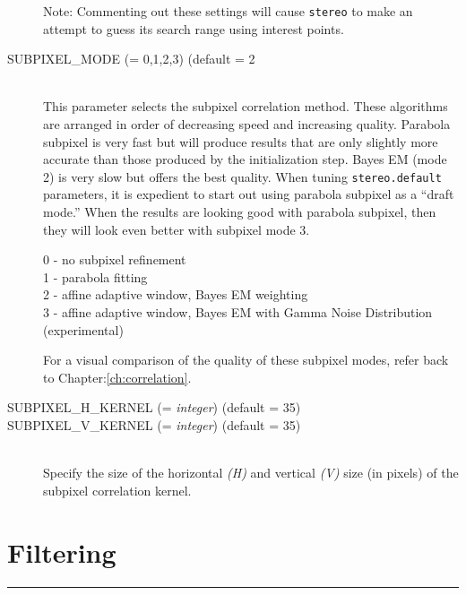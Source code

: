 \begin{description}
  Note: Commenting out these settings will cause \texttt{stereo} to make an
  attempt to guess its search range using interest points.

\item[SUBPIXEL\_MODE \textnormal{\small{(= 0,1,2,3)}} (default = 2] \hfill \\
  This parameter selects the subpixel correlation method. These
  algorithms are arranged in order of decreasing speed and increasing
  quality. Parabola subpixel is very fast but will produce results
  that are only slightly more accurate than those produced by the
  initialization step. Bayes EM (mode 2) is very slow but offers the
  best quality. When tuning {\tt stereo.default} parameters, it is
  expedient to start out using parabola subpixel as a ``draft mode.''
  When the results are looking good with parabola subpixel, then they
  will look even better with subpixel mode 3.

  \begin{description}
    \item[0 - no subpixel refinement]
    \item[1 - parabola fitting ]
    \item[2 - affine adaptive window, Bayes EM weighting ]
    \item[3 - affine adaptive window, Bayes EM with Gamma Noise Distribution (experimental) ]
  \end{description}

  For a visual comparison of the quality of these subpixel modes,
  refer back to Chapter:\ref{ch:correlation}.

\item[SUBPIXEL\_H\_KERNEL \textnormal{\small{(= \emph{integer})}} (default = 35)]
\item[SUBPIXEL\_V\_KERNEL \textnormal{\small{(= \emph{integer})}} (default = 35)] \hfill \\
  Specify the size of the horizontal \emph{(H)} and vertical
  \emph{(V)} size (in pixels) of the subpixel correlation kernel.

\end{description}


\section{Filtering}
\hrule
\bigskip

